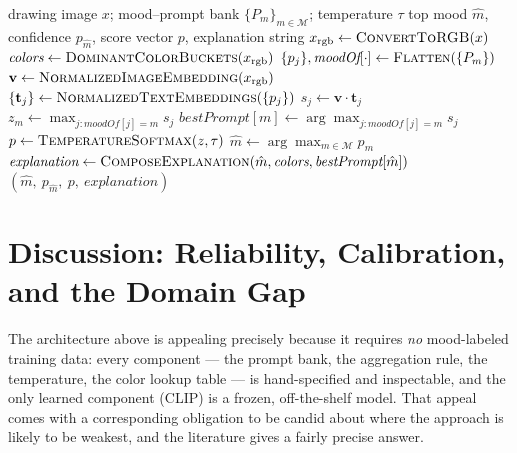 \documentclass[10pt,twocolumn,letterpaper]{article}
\begin{document}
\begin{algorithm*}[t]
\caption{Zero-shot mood inference for a submitted drawing}
\label{alg:pipeline}
\begin{algorithmic}[1]
\Require drawing image $x$; mood--prompt bank $\{P_m\}_{m \in \mathcal{M}}$; temperature $\tau$
\Ensure top mood $\hat m$, confidence $p_{\hat m}$, score vector $p$, explanation string
\State $x_{\text{rgb}} \gets \textsc{ConvertToRGB}(x)$
\State $\textit{colors} \gets \textsc{DominantColorBuckets}(x_{\text{rgb}})$ 
\State $\{p_j\}, \textit{moodOf}[\cdot] \gets \textsc{Flatten}(\{P_m\})$ 
\State $\mathbf{v} \gets \textsc{NormalizedImageEmbedding}(x_{\text{rgb}})$ 
\State $\{\mathbf{t}_j\} \gets \textsc{NormalizedTextEmbeddings}(\{p_j\})$ 
    \State $s_j \gets \mathbf{v} \cdot \mathbf{t}_j$ 
\EndFor
{}
    \State $z_m \gets \max_{j : \textit{moodOf}[j] = m} s_j$ 
    \State $\textit{bestPrompt}[m] \gets \arg\max_{j : \textit{moodOf}[j] = m} s_j$
\EndFor
\State $p \gets \textsc{TemperatureSoftmax}(z, \tau)$ 
\State $\hat m \gets \arg\max_{m \in \mathcal{M}} p_m$
\State $\textit{explanation} \gets \textsc{ComposeExplanation}(\hat m, \textit{colors}, \textit{bestPrompt}[\hat m])$
\State \Return $(\hat m,\ p_{\hat m},\ p,\ \textit{explanation})$
\end{algorithmic}
\end{algorithm*}

\section{Discussion: Reliability, Calibration, and the Domain Gap}
\label{sec:discussion}
\label{sec:limitations}

The architecture above is appealing precisely because it requires \emph{no} mood-labeled training data: every component --- the prompt bank, the aggregation rule, the temperature, the color lookup table --- is hand-specified and inspectable, and the only learned component (CLIP) is a frozen, off-the-shelf model. That appeal comes with a corresponding obligation to be candid about where the approach is likely to be weakest, and the literature gives a fairly precise answer.
\end{document}
